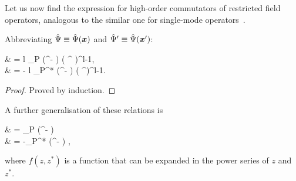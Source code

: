 Let us now find the expression for high-order commutators of restricted field operators, analogous to the similar one for single-mode operators~\cite{Louisell1990}.

\begin{lemma}
	Abbreviating $\hat{\Psi} \equiv \hat{\Psi}(\boldsymbol{x})$ and $\hat{\Psi}^\prime \equiv \hat{\Psi}(\boldsymbol{x}^\prime)$:
	\begin{eqn*}
		& = l \delta_P (\xvec^\prime - \xvec) ( \Psiop^{\prime\dagger} )^{l-1}, \\
		& = - l \delta_P^* (\xvec^\prime - \xvec) ( \Psiop^\prime )^{l-1}.
	\end{eqn*}
\end{lemma}
\begin{proof}
Proved by induction.
\end{proof}

A further generalisation of these relations is

\begin{lemma}
\label{lmm:functional-commutators}
	\begin{eqn*}
		& = \delta_P (\xvec^\prime - \xvec) \frac{\partial f}{\partial \Psiop^{\prime\dagger}} \\
		& = -\delta_P^* (\xvec^\prime - \xvec) \frac{\partial f}{\partial \Psiop^\prime},
	\end{eqn*}
	where $f(z, z^*)$ is a function that can be expanded in the power series of $z$ and $z^*$.
\end{lemma}
